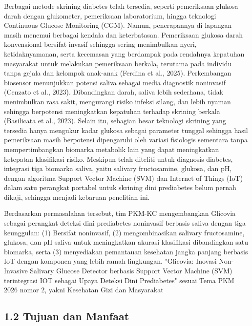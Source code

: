 \documentclass[12pt,a4paper]{article}
\begin{document}
Berbagai metode skrining diabetes telah tersedia, seperti pemeriksaan glukosa darah dengan glukometer, pemeriksaan laboratorium, hingga teknologi Continuous Glucose Monitoring (CGM). Namun, penerapannya di lapangan masih menemui berbagai kendala dan keterbatasan. Pemeriksaan glukosa darah konvensional bersifat invasif sehingga sering menimbulkan nyeri, ketidaknyamanan, serta kecemasan yang berdampak pada rendahnya kepatuhan masyarakat untuk melakukan pemeriksaan berkala, terutama pada individu tanpa gejala dan kelompok anak-anak (Ferdina et al., 2025). Perkembangan biosensor menunjukkan potensi saliva sebagai media diagnostik noninvasif (Cenzato et al., 2023). Dibandingkan darah, saliva lebih sederhana, tidak menimbulkan rasa sakit, mengurangi risiko infeksi silang, dan lebih nyaman sehingga berpotensi meningkatkan kepatuhan terhadap skrining berkala (Basilicata et al., 2023). Selain itu, sebagian besar teknologi skrining yang tersedia hanya mengukur kadar glukosa sebagai parameter tunggal sehingga hasil pemeriksaan masih berpotensi dipengaruhi oleh variasi fisiologis sementara tanpa mempertimbangkan biomarka metabolik lain yang dapat meningkatkan ketepatan klasifikasi risiko. Meskipun telah diteliti untuk diagnosis diabetes, integrasi tiga biomarka saliva, yaitu salivary fructosamine, glukosa, dan pH, dengan algoritma Support Vector Machine (SVM) dan Internet of Things (IoT) dalam satu perangkat portabel untuk skrining dini prediabetes belum pernah dikaji, sehingga menjadi kebaruan penelitian ini.

Berdasarkan permasalahan tersebut, tim PKM-KC mengembangkan Glicovia sebagai perangkat deteksi dini prediabetes noninvasif berbasis saliva dengan tiga keunggulan: (1) Bersifat noninvasif, (2) mengombinasikan salivary fructosamine, glukosa, dan pH saliva untuk meningkatkan akurasi klasifikasi dibandingkan satu biomarka, serta (3) menyediakan pemantauan kesehatan jangka panjang berbasis IoT dengan komponen yang lebih ramah lingkungan. "Glicovia: Inovasi Non-Invasive Salivary Glucose Detector berbasis Support Vector Machine (SVM) terintegrasi IOT sebagai Upaya Deteksi Dini Prediabetes" sesuai Tema PKM 2026 nomor 2, yakni Kesehatan Gizi dan Masyarakat

\subsection*{1.2 Tujuan dan Manfaat}
\end{document}
